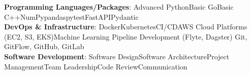 \textbf{Programming Languages/Packages}: Advanced Python\inlinespace Basic Go\inlinespace Basic C++\inlinespace NumPy\inlinespace pandas\inlinespace pytest\inlinespace FastAPI\inlinespace Pydantic \\[6pt]

\textbf{DevOps \& Infrastructure}: Docker\inlinespace Kubernetes\inlinespace CI/CD\inlinespace AWS Cloud Platforms (EC2, S3, EKS)\inlinespace Machine Learning Pipeline Development (Flyte, Dagster) \inlinespace Git, GitFlow, GitHub, GitLab \\[6pt]

\textbf{Software Development}: Software Design\inlinespace Software Architecture\inlinespace Project Management\inlinespace Team Leadership\inlinespace Code Review\inlinespace Communication
